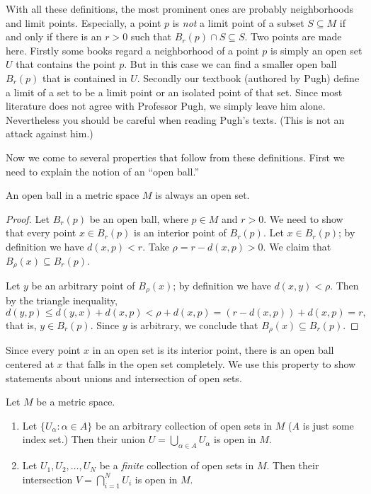 \documentclass[11pt]{article}
\begin{document}
With all these definitions, the most prominent ones are probably neighborhoods and limit points.
Especially, a point $p$ is {\em not} a limit point of a subset $S \subseteq M$ if and only if there is an $r > 0$ such that $B_r(p) \cap S \subseteq S$.
Two points are made here.  Firstly some books regard a neighborhood of a point $p$ is simply an open set $U$ that contains the point $p$.  But in this case we can find a smaller open ball $B_r(p)$ that is contained in $U$. 
Secondly our textbook (authored by Pugh) define a limit of a set to be a limit point or an isolated point of that set.
Since most literature does not agree with Professor Pugh, we simply leave him alone.  Nevertheless you should be careful when reading Pugh's texts.  (This is not an attack against him.)

Now we come to several properties that follow from these definitions.
First we need to explain the notion of an ``open ball.''

\begin{prop}
  An open ball in a metric space $M$ is always an open set.
\end{prop}

\begin{proof}
  Let $B_r(p)$ be an open ball, where $p \in M$ and $r > 0$.
  We need to show that every point $x \in B_r(p)$ is an interior point of $B_r(p)$.
  Let $x \in B_r(p)$; by definition we have $d(x,p) < r$.
  Take $\rho = r - d(x,p) > 0$.  We claim that $B_\rho(x) \subseteq B_r(p)$.

  Let $y$ be an arbitrary point of $B_\rho(x)$; by definition we have $d(x,y) < \rho$.
  Then by the triangle inequality,
  \[
    d(y,p) \leqslant d(y,x) + d(x,p) < \rho + d(x,p) = (r - d(x,p)) + d(x,p) = r,
  \]
  that is, $y \in B_r(p)$.
  Since $y$ is arbitrary, we conclude that $B_\rho(x) \subseteq B_r(p)$.
\end{proof}

Since every point $x$ in an open set is its interior point, there is an open ball centered at $x$ that falls in the open set completely.
We use this property to show statements about unions and intersection of open sets.

\begin{prop}
  \label{open-union-intersection}
  Let $M$ be a metric space.
  \begin{enumerate}[$(a)$]
    \item Let $\{ U_\alpha \colon \alpha \in A \}$ be an arbitrary collection of open sets in $M$ ($A$ is just some index set.)
      Then their union $U = \displaystyle \bigcup_{\alpha \in A} U_\alpha$ is open in $M$.

    \item Let $U_1, U_2, \dots, U_N$ be a {\em finite} collection of open sets in $M$.
      Then their intersection $V = \displaystyle \bigcap_{i=1}^N U_i$ is open in $M$.
  \end{enumerate}
\end{prop}
\end{document}
